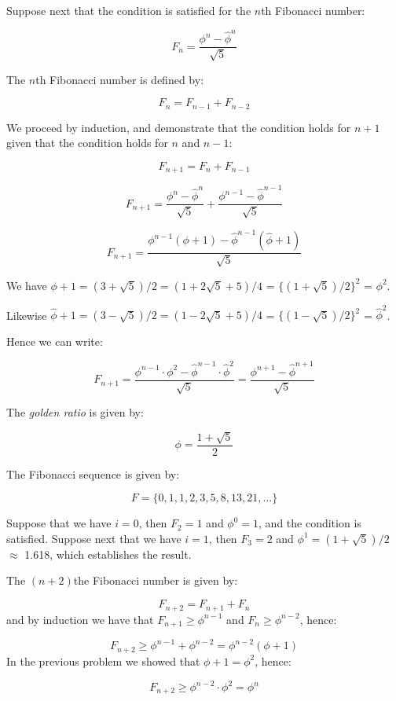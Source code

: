 \documentclass[a4paper,12pt]{article}
\begin{document}
Suppose next that the condition is satisfied for the $n$th Fibonacci number:

\[ F_n = \frac{\phi^n-\hat{\phi}^n}{\sqrt{5}} \] 

The $n$th Fibonacci number is defined by:

\[ F_n = F_{n-1} + F_{n-2} \]

We proceed by induction, and demonstrate that the condition holds for $n+1$ given that the condition holds for $n$ and $n-1$:

\[ F_{n+1} = F_n + F_{n-1} \]

\[ F_{n+1} = \frac{\phi^n - \hat{\phi}^n}{\sqrt{5}} + \frac{\phi^{n-1} - \hat{\phi}^{n-1}}{\sqrt{5}} \]

\[ F_{n+1} = \frac{\phi^{n-1}\left(\phi + 1\right) - \hat{\phi}^{n-1}(\hat{\phi} + 1)}{\sqrt{5}} \]

We have $\phi + 1 = (3 + \sqrt{5})/2 = (1 + 2\sqrt{5} +5)/4$ = $\{(1 + \sqrt{5})/2\}^2$ = $\phi^2$.

\vspace{2mm}
Likewise $\hat{\phi} + 1 = (3 - \sqrt{5})/2 = (1 - 2\sqrt{5} + 5)/4$ = $\{(1 - \sqrt{5})/2\}^2$ = $\hat{\phi}^2$.

\vspace{2mm}
Hence we can write:

\[ F_{n+1} = \frac{\phi^{n-1} \cdot \phi^2 - \hat{\phi}^{n-1} \cdot \hat{\phi}^2}{\sqrt{5}}  = \frac{\phi^{n+1} - \hat{\phi}^{n+1}}{\sqrt{5}} \]

\vspace{2mm}

The \textit{golden ratio} is given by:

\[ \phi = \frac{1 + \sqrt{5}}{2} \]

The Fibonacci sequence is given by:

\[ F = \{0, 1, 1, 2, 3, 5, 8, 13, 21, ... \} \]

Suppose that we have $i=0$, then $F_2 = 1$ and $\phi^0 = 1$, and the condition is satisfied. Suppose next that we have $i=1$, then $F_3 = 2$ and $\phi^1 = (1+\sqrt{5})/2$ $\approx$ 1.618, which establishes the result. 

The $(n+2)$the Fibonacci number is given by:

\[ F_{n+2} = F_{n+1} + F_n \]
and by induction we have that $F_{n+1} \ge \phi^{n-1}$ and $F_n \ge \phi^{n-2}$, hence:

\[ F_{n+2} \ge \phi^{n-1} + \phi^{n-2} = \phi^{n-2}\left(\phi + 1\right) \]
In the previous problem we showed that $\phi + 1 = \phi^2$, hence:

\[ F_{n+2} \ge \phi^{n-2} \cdot \phi^2 = \phi^n \]
\end{document}
